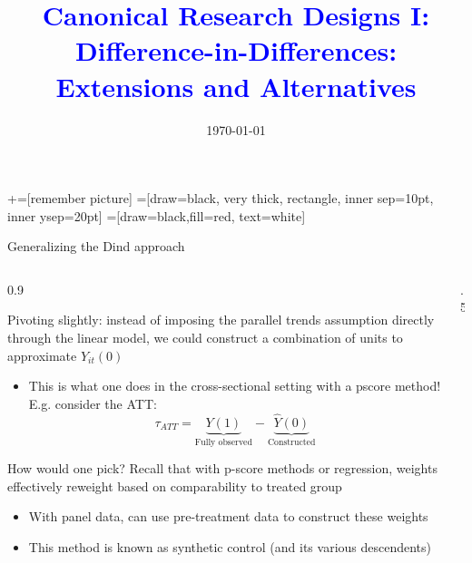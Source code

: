 \documentclass[notes,11pt, aspectratio=169]{beamer}
\title[]{\textcolor{blue}{Canonical Research Designs I:\\ Difference-in-Differences:\\ Extensions and Alternatives}}
\author[PGP]{}
\institute[FRBNY]{\small{\begin{tabular}{c}
  Paul Goldsmith-Pinkham  \\
\end{tabular}}}
\date{\today}
\newenvironment{wideitemize}{\itemize\addtolength{\itemsep}{10pt}}{\enditemize}
\begin{document}
\newcommand\marktopleft[1]{%
    \tikz[overlay,remember picture]
        \node (marker-#1-a) at (-.3em,.3em) {};%
}
\newcommand\markbottomright[2]{%
    \tikz[overlay,remember picture]
        \node (marker-#1-b) at (0em,0em) {};%
}
+=[remember picture]
 =[draw=black, very thick, rectangle, inner sep=10pt, inner ysep=20pt]
 =[draw=black,fill=red, text=white]

\begin{frame}
\maketitle
\end{frame}


\begin{frame}{Generalizing the Dind approach }
  \begin{columns}[T] %
    \begin{column}{0.9\textwidth}
      \begin{wideitemize}
      \item Pivoting slightly: instead of imposing the parallel trends
        assumption directly through the linear model, we could
        construct a combination of units to approximate $Y_{it}(0)$
        \begin{itemize}
        \item This is what one does in the cross-sectional setting with a
          pscore method! E.g. consider the ATT:
          \begin{equation*}
            \tau_{ATT} = \underbrace{Y(1)}_{\text{Fully observed}} - \underbrace{\hat{Y}(0)}_{\text{Constructed}}
          \end{equation*}
        \end{itemize}
      \item How would one pick? Recall that with p-score methods or
        regression, weights effectively reweight based on
        comparability to treated group
        \begin{itemize}
        \item With panel data, can use pre-treatment data to construct
          these weights
        \item This method is known as synthetic control (and its various descendents)
        \end{itemize}
      \end{wideitemize}
    \end{column}%
    \hfill%
    \begin{column}{.5\textwidth}
    \end{column}%
  \end{columns}
\end{frame}
\end{document}
